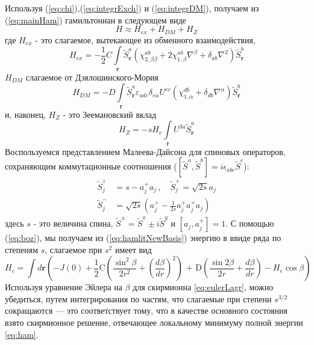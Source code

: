 \documentclass[a4paper,article,14pt]{extarticle}
\begin{document}
Используя (\ref{eq:chi}),(\ref{eq:integrExch}) и (\ref{eq:integrDM}), получаем из (\ref{eq:mainHam}) гамильтониан в следующем виде
\begin{equation}
\label{eq:hamlitNewBasis}
H \approx {H_{ex}} + {H_{DM}} + {H_Z}
\end{equation}
где $H_{ex}$ - это слагаемое, вытекающее из обменного взаимодействия,
\[{H_{ex}} =  - \frac{1}{2}C\int\limits_{\mathbf{r}} {\tilde S_{\mathbf{r}}^a\left( {\chi _{2,\beta \beta }^{ab} + 2\chi _{1,\beta }^{ab}{\nabla ^\beta } + {\delta _{ab}} \nabla ^ 2 } \right)\tilde S_{\mathbf{r}}^b} \]
$H_{DM}$ слагаемое от Дзялошинского-Мория
\[{H_{DM}} =  - D\int\limits_{\mathbf{r}} {\tilde S_{\mathbf{r}}^a{\varepsilon _{adc}}{\delta _{e\alpha }}{U^{ec}}\left( {\chi _{1,\alpha }^{db} + {\delta _{db}}{\nabla ^\alpha }} \right)\tilde S_{\mathbf{r}}^b} \]
и, наконец, $H_Z$ - это Зеемановский вклад 
\[{H_Z} =  - s H_e \int\limits_{\mathbf{r}} {{U^{3a}}\tilde S_{\mathbf{r}}^a} \]
Воспользуемся представлением Малеева-Дайсона для спиновых операторов, сохраняющим коммутационные соотношения  ($[\tilde{S}^a,\tilde{S}^b] = i \epsilon_{abc}\tilde{S}^c$):
\begin{equation} 
\begin{aligned} 
\label{eq:boz}
     \tilde{S}^{z}_{j} &=s-a^+_{ j} a_{ j} \,, \quad   
       \tilde{S}^{+}_{j}=\sqrt{2s}a_{ j}  \\
     \tilde{S}^{-}_{j} &=\sqrt{2s}\left( a^{+}_{ j} - \frac{1}{2s}a^+_{ j}a^{+}_{ j}a_{ j} \right)
  \end{aligned}  
 \end{equation} 
здесь $s$ - это величина спина,  $\tilde S^{\pm} = \tilde S^{x} \pm i \tilde S^{y}$ и $[a_{ j},a^+_{ j}] = 1$.  
С помощью (\ref{eq:boz}), мы получаем из (\ref{eq:hamlitNewBasis}) энергию в ввиде ряда по степеням $s$, слагаемое при $s^2$ имеет вид
\begin{equation}
\label{eq:cls_skx_eng}
{H_c} = \int {d\mathbf{r} \left( {-J\left( 0 \right) + \frac{1}{2}{\text{C}}\left( {\frac{{{{\sin }^2}\beta }}{{2{r^2}}} + {{\left( {\frac{{d\beta }}{{dr}}} \right)}^2}} \right){\text{ + D}}\left( {\frac{{\sin 2\beta }}{{2r}} + \frac{{d\beta }}{{dr}}} \right) - H_e \cos \beta } \right)}
\end{equation} 
Используя уравнение Эйлера на $\beta$ для скирмионна \eqref{eq:eulerLagr}, можно убедиться, путем интегрирования по частям, что слагаемые при степени $s^{3/2}$ сокращаются --- это соответствует тому, что в качестве основного состояния взято скирмионное решение, отвечающее локальному минимуму полной энергии \eqref{eq:ham}. 
\end{document}
